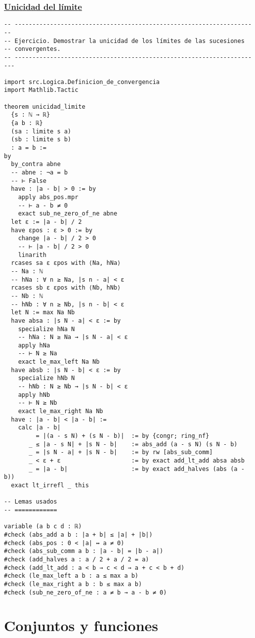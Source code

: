 \subsection{\href{./src/Logica/Unicidad\_del\_limite.lean}{Unicidad del límite}}
\label{sec:org4c69ace}
\begin{verbatim}
-- ---------------------------------------------------------------------
-- Ejercicio. Demostrar la unicidad de los límites de las sucesiones
-- convergentes.
-- ----------------------------------------------------------------------

import src.Logica.Definicion_de_convergencia
import Mathlib.Tactic

theorem unicidad_limite
  {s : ℕ → ℝ}
  {a b : ℝ}
  (sa : limite s a)
  (sb : limite s b)
  : a = b :=
by
  by_contra abne
  -- abne : ¬a = b
  -- ⊢ False
  have : |a - b| > 0 := by
    apply abs_pos.mpr
    -- ⊢ a - b ≠ 0
    exact sub_ne_zero_of_ne abne
  let ε := |a - b| / 2
  have εpos : ε > 0 := by
    change |a - b| / 2 > 0
    -- ⊢ |a - b| / 2 > 0
    linarith
  rcases sa ε εpos with ⟨Na, hNa⟩
  -- Na : ℕ
  -- hNa : ∀ n ≥ Na, |s n - a| < ε
  rcases sb ε εpos with ⟨Nb, hNb⟩
  -- Nb : ℕ
  -- hNb : ∀ n ≥ Nb, |s n - b| < ε
  let N := max Na Nb
  have absa : |s N - a| < ε := by
    specialize hNa N
    -- hNa : N ≥ Na → |s N - a| < ε
    apply hNa
    -- ⊢ N ≥ Na
    exact le_max_left Na Nb
  have absb : |s N - b| < ε := by
    specialize hNb N
    -- hNb : N ≥ Nb → |s N - b| < ε
    apply hNb
    -- ⊢ N ≥ Nb
    exact le_max_right Na Nb
  have : |a - b| < |a - b| :=
    calc |a - b|
         = |(a - s N) + (s N - b)|  := by {congr; ring_nf}
       _ ≤ |a - s N| + |s N - b|    := abs_add (a - s N) (s N - b)
       _ = |s N - a| + |s N - b|    := by rw [abs_sub_comm]
       _ < ε + ε                    := by exact add_lt_add absa absb
       _ = |a - b|                  := by exact add_halves (abs (a - b))
  exact lt_irrefl _ this

-- Lemas usados
-- ============

variable (a b c d : ℝ)
#check (abs_add a b : |a + b| ≤ |a| + |b|)
#check (abs_pos : 0 < |a| ↔ a ≠ 0)
#check (abs_sub_comm a b : |a - b| = |b - a|)
#check (add_halves a : a / 2 + a / 2 = a)
#check (add_lt_add : a < b → c < d → a + c < b + d)
#check (le_max_left a b : a ≤ max a b)
#check (le_max_right a b : b ≤ max a b)
#check (sub_ne_zero_of_ne : a ≠ b → a - b ≠ 0)
\end{verbatim}

\chapter{Conjuntos y funciones}
\label{sec:org35fc4f3}

